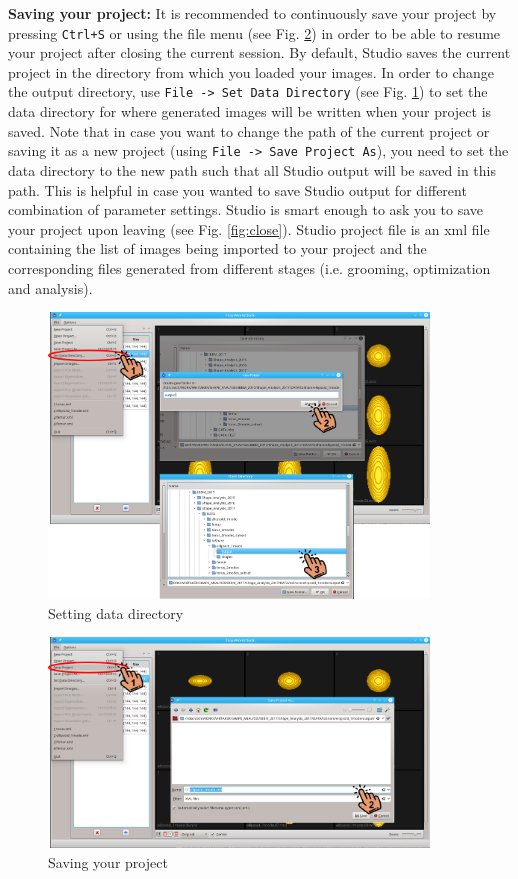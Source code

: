 \documentclass[letterpaper,12pt]{article}   %
\begin{document}
\vspace{0.1in}
\noindent\textbf{Saving your project:} It is recommended to continuously save your project by pressing \texttt{Ctrl+S} or using the file menu (see Fig. \ref{fig:save}) in order to be able to resume your project after closing the current session. By default, Studio saves the current project in the directory from which you loaded your images. In order to change the output directory, use \texttt{File -> Set Data Directory} (see Fig. \ref{fig:setdir})  to set the data directory for where generated images will be written when your project is saved. Note that in case you want to change the path of the current project or saving it as a new project (using \texttt{File -> Save Project As}), you need to set the data directory to the new path such that all Studio output will be saved in this path. This is helpful in case you wanted to save Studio output for different combination of parameter settings. Studio is smart enough to ask you to save your project upon leaving (see Fig. \ref{fig:close}). Studio project file is an xml file containing the list of images being imported to your project and the corresponding files generated from different stages (i.e. grooming, optimization and analysis). \vspace{0.2in}

\begin{figure}[!htp]
	\centering
	\includegraphics[width=0.9\textwidth]{figs_v2/set_dir.png}
	\caption{Setting data directory}
	\label{fig:setdir}
\end{figure}

\begin{figure}[!htp]
\centering
\includegraphics[width=0.9\textwidth]{figs_v2/save.png}
\caption{Saving your project}
\label{fig:save}
\end{figure}
\end{document}
